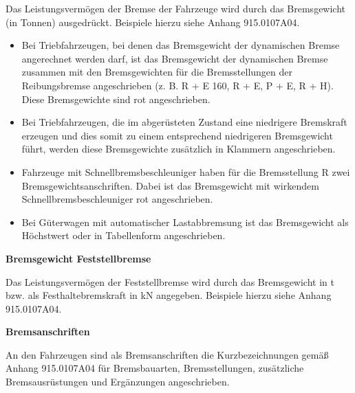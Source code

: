 Das Leistungsvermögen der Bremse der Fahrzeuge wird durch das Bremsgewicht (in Tonnen) ausgedrückt. Beispiele hierzu siehe Anhang 915.0107A04.
\begin{itemize}
    \item Bei Triebfahrzeugen, bei denen das Bremsgewicht der dynamischen Bremse angerechnet werden darf, ist das Bremsgewicht der dynamischen Bremse zusammen mit den Bremsgewichten für die Bremsstellungen der Reibungsbremse angeschrieben (z. B. R + E 160, R + E, P + E, R + H). Diese Bremsgewichte sind rot angeschrieben.
    \item Bei Triebfahrzeugen, die im abgerüsteten Zustand eine niedrigere Bremskraft erzeugen und dies somit zu einem entsprechend niedrigeren Bremsgewicht führt, werden diese Bremsgewichte zusätzlich in Klammern angeschrieben. 
    \item Fahrzeuge mit Schnellbremsbeschleuniger haben für die Bremsstellung R zwei Bremsgewichtsanschriften. Dabei ist das Bremsgewicht mit wirkendem Schnellbremsbeschleuniger rot angeschrieben. 
    \item Bei Güterwagen mit automatischer Lastabbremsung ist das Bremsgewicht als Höchstwert oder in Tabellenform angeschrieben.
\end{itemize}
\textbf{Bremsgewicht Feststellbremse}\par
Das Leistungsvermögen der Feststellbremse wird durch das Bremsgewicht in t bzw. als Festhaltebremskraft in kN angegeben. Beispiele hierzu siehe Anhang 915.0107A04.\par
\textbf{Bremsanschriften}\par
An den Fahrzeugen sind als Bremsanschriften die Kurzbezeichnungen gemäß Anhang 915.0107A04 für Bremsbauarten, Bremsstellungen, zusätzliche Bremsausrüstungen und Ergänzungen angeschrieben.
